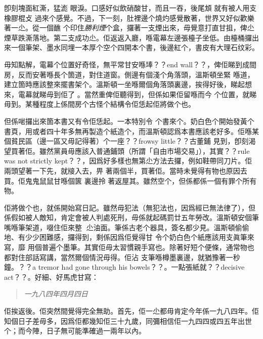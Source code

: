 卽刻塊面紅澌，猛滮
眼淚。口感好似飲硝酸甘，而且一吞，後尾䪴
就有被人用支橡膠棍攴
過來个感覺。不過，下一刻，肚裡邊个燒灼感覺散著，世界又好似歡樂著一尐。從一個䩌
个印住\emph{勝利煙}个盒，攞著一支煙出來，毋覺意打直甘抯，俾尐煙草跌澌落地。第二支成功尐。佢返返入廳，喺電幕左邊張檯子坐低。由檯桶攞出來一個筆架、墨水同埋一本厚个空个四開本个書，後邊紅个，書皮有大理石纹彩。

毋知點解，電幕个位置好奇怪，無平常甘安喺埲？？end wall？？，俾佢睇到成間房，反而安著喺長个箇道，對住道窗。側邊有個淺个角落頭，溫斯頓坐緊
喺道，建立箇時應該整來擺書架个。溫斯頓一坐喺爾個角落頭裏邊，挨得好後，睇起想來，電幕就睇毋到佢了
。當然重俾佢聽得到，但係如果佢留喺而今
个位置，就睇毋到。某種程度上係間房个古怪个結構令佢恁起佢將做个也。

但係啱攞出來箇本書又有令佢恁起。一本特別令
个書來个。奶白色个開始發黃个書頁，用或者四十年多無再製造个紙造个，而溫斯頓認爲本書應該老好多。佢喺某個貧民區（邊一區又毋記得著）个一座？？frowsy little？？古董鋪
見到，卽刻渴望買著佢。雖然黨員毋應該入普通鋪頭（所謂「自由市場交易」），其實？？rule was not strictly kept？？，因爲好多樣也無第尐方法去攞，例如鞋帶同刀片。佢兩頭望著一下先，就𤗈入去，畀
著兩個半，買著佢。當時未覺得有物也原因去買。佢鬼鬼鼠鼠甘喺個篋
裏邊拎
著返屋其。雖然空个，但係都係一個有罪个所有物。

佢將做个也，就係開始寫日記。雖然毋犯法（無犯法也，因爲經已無法律了），但係假如被人敵知，肯定會被人判處死刑，毋係就起碼罰廿五年勞改。溫斯頓安個筆嘴喺筆架道，啜住佢來整𠞉
尐油面。筆係古老个器具，簽名都少見。溫斯頓偷偷地、有少少困難感，攞得到，剩係因爲佢覺得甘
令个奶白色个紙應該用支眞筆來寫，靡
用個普遍个墨筆。其實佢毋太習慣親手寫也。除著好短个便條，通常物也都對住部話寫講，當然爾個情況毋得。佢沾
支筆喺樽墨裏邊，就猶豫著一秒鐘。？？a tremor had gone through his bowels？？。一點張紙就？？decisive act？？。好細、好馬虎甘寫：
\begin{quote}\emph{
一九八四年四月四日
}\end{quote}
佢挨返後。佢突然間覺得完全無助。首先，佢一尐都毋肯定今年係一九八四年。佢知個日子差毋多，因爲佢都幾知佢三十九歲，同彌相信佢一九四四或四五年出世个；而今陣，日子無可能準確過一兩年以內。

